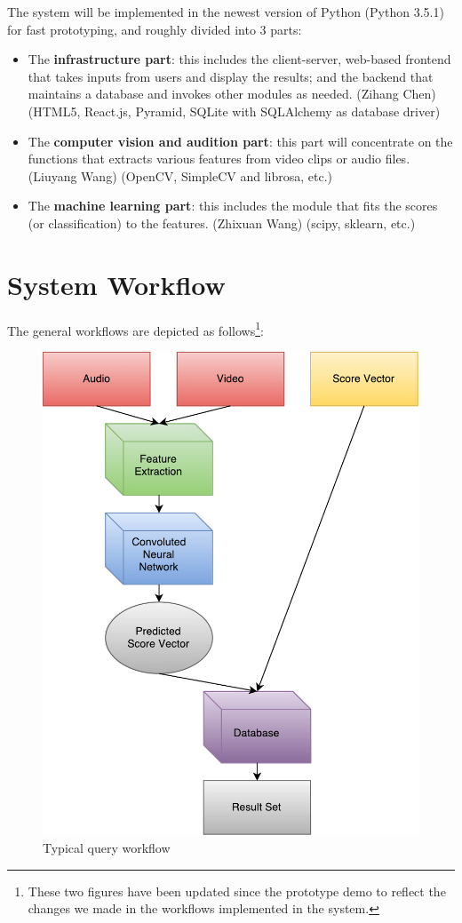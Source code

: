 \documentclass{report}
\begin{document}
The system will be implemented in the newest version of Python (Python 3.5.1) for fast prototyping, and roughly divided into 3 parts:
\begin{itemize}
\item The \textbf{infrastructure part}: this includes the client-server, web-based frontend that takes inputs from users and display the results; and the backend that maintains a database and invokes other modules as needed. (Zihang Chen) (HTML5, React.js, Pyramid, SQLite with SQLAlchemy as database driver)
\item The \textbf{computer vision and audition part}: this part will concentrate on the functions that extracts various features from video clips or audio files. (Liuyang Wang) (OpenCV, SimpleCV and librosa, etc.)
\item The \textbf{machine learning part}: this includes the module that fits the scores (or classification) to the features. (Zhixuan Wang) (scipy, sklearn, etc.)
\end{itemize}

\section{System Workflow}

The general workflows are depicted as follows\footnote{These two figures have been updated since the prototype demo to reflect the changes we made in the workflows implemented in the system.}:

\begin{figure}[H]
  \centering
  \includegraphics[scale=0.7]{vdf-query.pdf}
  \caption{Typical query workflow}
  \label{fig:qwf}
\end{figure}
\end{document}
